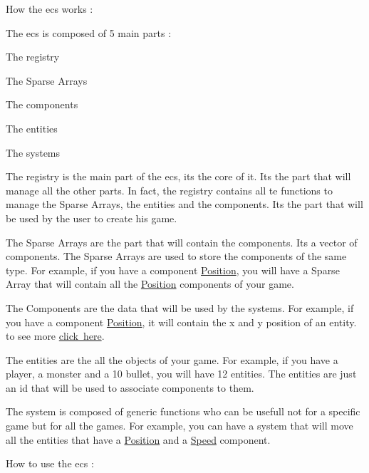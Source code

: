 

How the ecs works \+:

The ecs is composed of 5 main parts \+:
\begin{DoxyItemize}
\item The registry
\item The Sparse Arrays
\item The components
\item The entities
\item The systems
\end{DoxyItemize}
\begin{DoxyEnumerate}
\item The registry is the main part of the ecs, it\textquotesingle{}s the core of it. It\textquotesingle{}s the part that will manage all the other parts. In fact, the registry contains all te functions to manage the Sparse Arrays, the entities and the components. It\textquotesingle{}s the part that will be used by the user to create his game.
\item The Sparse Arrays are the part that will contain the components. It\textquotesingle{}s a vector of components. The Sparse Arrays are used to store the components of the same type. For example, if you have a component \mbox{\hyperlink{structPosition}{Position}}, you will have a Sparse Array that will contain all the \mbox{\hyperlink{structPosition}{Position}} components of your game.
\item The Components are the data that will be used by the systems. For example, if you have a component \mbox{\hyperlink{structPosition}{Position}}, it will contain the x and y position of an entity. to see more \mbox{\hyperlink{md_ecs_components}{click here}}.
\item The entities are the all the objects of your game. For example, if you have a player, a monster and a 10 bullet, you will have 12 entities. The entities are just an id that will be used to associate components to them.
\item The system is composed of generic functions who can be usefull not for a specific game but for all the games. For example, you can have a system that will move all the entities that have a \mbox{\hyperlink{structPosition}{Position}} and a \mbox{\hyperlink{structSpeed}{Speed}} component.
\end{DoxyEnumerate}

How to use the ecs \+:


